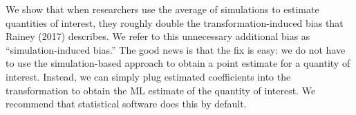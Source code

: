 \documentclass[11pt]{article}
\begin{document}
We show that when researchers use the average of simulations to estimate quantities of interest, they roughly double the transformation-induced bias that Rainey (2017) describes. We refer to this unnecessary additional bias as ``simulation-induced bias.'' The good news is that the fix is easy: we do not have to use the simulation-based approach to obtain a point estimate for a quantity of interest. Instead, we can simply plug estimated coefficients into the transformation to obtain the ML estimate of the quantity of interest. We recommend that statistical software does this by default.

\singlespace
\clearpage
\small


\end{document}
